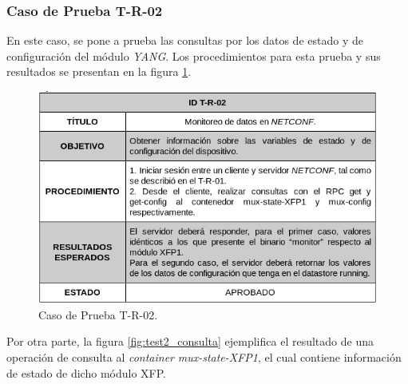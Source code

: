   \subsubsection{Caso de Prueba T-R-02}
  En este caso, se pone a prueba las consultas por los datos de estado y de configuración del módulo \textit{YANG}. Los procedimientos para esta prueba y sus resultados se presentan en la figura \ref{fig:test2}. 

\begin{figure}[H]
	\centering
	\includegraphics[scale=0.6]{Figures/test2.png}
	\caption{Caso de Prueba T-R-02.}
	\label{fig:test2}
  \end{figure}

  Por otra parte, la figura \ref{fig:test2_consulta} ejemplifica el resultado de una operación de consulta al \textit{container} \textit{mux-state-XFP1}, el cual contiene información de estado de dicho módulo XFP.

